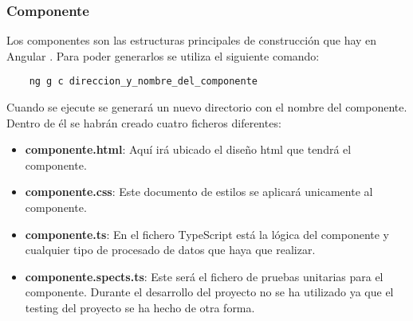 \subsubsection{Componente}
Los componentes son las estructuras principales de construcción que hay en Angular \cite{angular-components}. Para poder generarlos se utiliza el siguiente comando:
\begin{verbatim}
    ng g c direccion_y_nombre_del_componente
\end{verbatim}
Cuando se ejecute se generará un nuevo directorio con el nombre del componente. Dentro de él se habrán creado cuatro ficheros diferentes:
\begin{itemize}
    \item \textbf{componente.html}: Aquí irá ubicado el diseño html que tendrá el componente.
    \item \textbf{componente.css}: Este documento de estilos se aplicará unicamente al componente.
    \item \textbf{componente.ts}: En el fichero TypeScript está la lógica del componente y cualquier tipo de procesado de datos que haya que realizar.
    \item \textbf{componente.spects.ts}: Este será el fichero de pruebas unitarias para el componente. Durante el desarrollo del proyecto no se ha utilizado ya que el testing del proyecto se ha hecho de otra forma.
\end{itemize}